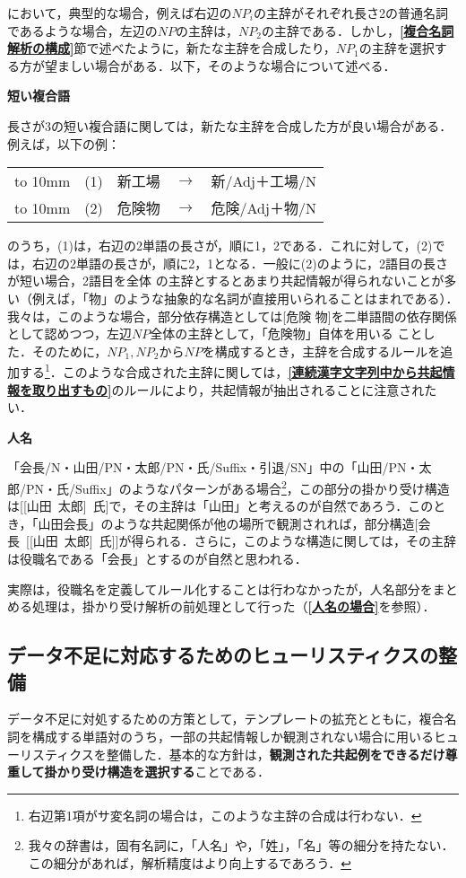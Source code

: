 \noindent
において，典型的な場合，例えば右辺の$NP_{i}$の主辞がそれぞれ長さ2の普通名詞であるような場合，左辺の$NP$の主辞は，$NP_2$の主辞である．しかし，{\bf \ref{複合名詞解析の構成}}節で述べたように，新たな主辞を合成したり，$NP_1$の主辞を選択する方が望ましい場合がある．以下，そのような場合について述べる．

\noindent
{\bf 短い複合語}

\noindent
長さが3の短い複合語に関しては，新たな主辞を合成した方が良い場合がある．例えば，以下の例：

\begin{tabular}{cllll}
\hbox to 10mm {\hfil} & (1) & 新工場 & $\rightarrow$ & 新/Adj＋工場/N\\
\hbox to 10mm {\hfil} & (2) & 危険物 & $\rightarrow$ & 危険/Adj＋物/N
\end{tabular}

\noindent
のうち，(1)は，右辺の2単語の長さが，順に1，2である．これに対して，(2)では，右辺の2単語の長さが，順に2，1となる．一般に(2)のように，2語目の長さが短い場合，2語目を全体\break
の主辞とするとあまり共起情報が得られないことが多い（例えば，「物」のような抽象的な名詞が直接用いられることはまれである）．我々は，このような場合，部分依存構造としては[危険 物]を二単語間の依存関係として認めつつ，左辺$NP$全体の主辞として，「危険物」自体を用いる\break
ことした．そのために，$NP_1, NP_2$から$NP$を構成するとき，主辞を合成するルールを追加する\footnote{右辺第1項がサ変名詞の場合は，このような主辞の合成は行わない．}．このような合成された主辞に関しては，{\bf \ref{連続漢字文字列中から共起情報を取り出すもの}}のルールにより，共起情報が抽出されることに注意されたい．

\noindent
{\bf 人名}

\noindent
「会長/N・山田/PN・太郎/PN・氏/Suffix・引退/SN」中の「山田/PN・太郎/PN・氏/Suffix」のようなパターンがある場合\footnote{我々の辞書は，固有名詞に，「人名」や，「姓」，「名」等の細分を持たない．この細分があれば，解析精度はより向上するであろう．}，この部分の掛かり受け構造は[[山田\ 太郎]\ 氏]で，その主辞は「山田」と考えるのが自然であろう．このとき，「山田会長」のような共起関係が他の場所で観測されれば，部分構造[会長\ [[山田\ 太郎]\ 氏]]が得られる．さらに，このような構造に関しては，その主辞は役職名である「会長」とするのが自然と思われる．

実際は，役職名を定義してルール化することは行わなかったが，人名部分をまとめる処理は，掛かり受け解析の前処理として行った（{\bf \ref{人名の場合}}を参照）．

\subsection{データ不足に対応するためのヒューリスティクスの整備}\label{データ不足に対応するためのヒューリスティクスの整備}
データ不足に対処するための方策として，テンプレートの拡充とともに，複合名詞を構成する単語対のうち，一部の共起情報しか観測されない場合に用いるヒューリスティクスを整備した．基本的な方針は，{\bf 観測された共起例をできるだけ尊重して掛かり受け構造を選択する}ことである．

